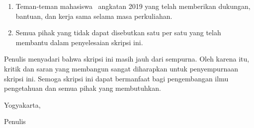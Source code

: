 {\begin{enumerate}
    \item Teman-teman mahasiswa \UniversityDepartment\ angkatan 2019 yang telah memberikan dukungan, bantuan, dan kerja sama selama masa perkuliahan.
    
    \item Semua pihak yang tidak dapat disebutkan satu per satu yang telah membantu dalam penyelesaian skripsi ini.
\end{enumerate}

Penulis menyadari bahwa skripsi ini masih jauh dari sempurna. Oleh karena itu, kritik dan saran yang membangun sangat diharapkan untuk penyempurnaan skripsi ini. Semoga skripsi ini dapat bermanfaat bagi pengembangan ilmu pengetahuan dan semua pihak yang membutuhkan.

}

\vspace{1cm}

\begin{flushright}
    {Yogyakarta, \TanggalPengesahan}\par
    {Penulis}\par
    \vspace{2cm}
    {\AuthorName}
\end{flushright}

\newpage

